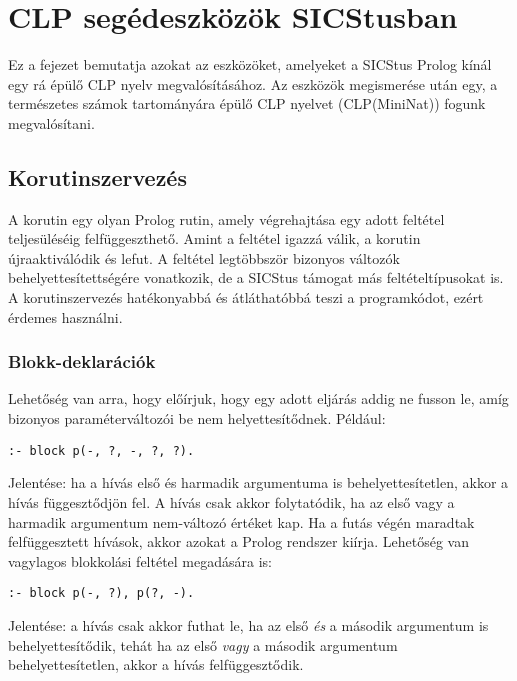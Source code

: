 \clearpage

\chapter{CLP segédeszközök SICStusban}

Ez a fejezet bemutatja azokat az eszközöket, amelyeket a SICStus Prolog
kínál egy rá épülő CLP nyelv megvalósításához. Az eszközök megismerése után
egy, a természetes számok tartományára épülő CLP nyelvet (CLP(MiniNat))
fogunk megvalósítani.

\section{Korutinszervezés}

A korutin egy olyan Prolog rutin, amely végrehajtása egy adott feltétel
teljesüléséig felfüggeszthető. Amint a feltétel igazzá válik, a korutin
újraaktiválódik és lefut. A feltétel legtöbbször bizonyos változók
behelyettesítettségére vonatkozik, de a SICStus támogat más feltételtípusokat
is. A korutinszervezés hatékonyabbá és átláthatóbbá teszi a programkódot,
ezért érdemes használni.

\subsection{Blokk-deklarációk}

Lehetőség van arra, hogy előírjuk, hogy egy adott eljárás addig ne fusson
le, amíg bizonyos paraméterváltozói be nem helyettesítődnek. Például:

\begin{verbatim}
:- block p(-, ?, -, ?, ?).
\end{verbatim}

Jelentése: ha a  hívás első és harmadik argumentuma is
behelyettesítetlen, akkor a hívás függesztődjön fel. A hívás csak akkor
folytatódik, ha az első vagy a harmadik argumentum nem-változó értéket
kap. Ha a futás végén maradtak felfüggesztett hívások, akkor azokat a Prolog
rendszer kiírja. Lehetőség van vagylagos blokkolási feltétel megadására is:

\begin{verbatim}
:- block p(-, ?), p(?, -).
\end{verbatim}

Jelentése: a  hívás csak akkor futhat le, ha az első \emph{és} a
második argumentum is behelyettesítődik, tehát ha az első \emph{vagy} a
második argumentum behelyettesítetlen, akkor a hívás felfüggesztődik.


